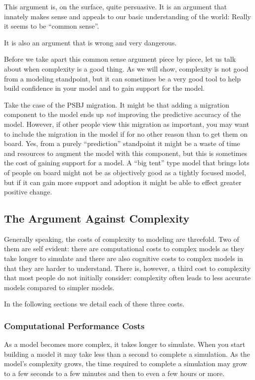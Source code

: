\documentclass[]{memoir}
\begin{document}
This argument is, on the surface, quite persuasive. It is an argument
that innately makes sense and appeals to our basic understanding of the
world: Really it seems to be ``common sense''.

It is also an argument that is wrong and very dangerous.

Before we take apart this common sense argument piece by piece, let us
talk about when complexity is a good thing. As we will show, complexity
is not good from a modeling standpoint, but it can sometimes be a very
good tool to help build confidence in your model and to gain support for
the model.

Take the case of the PSBJ migration. It might be that adding a migration
component to the model ends up \emph{not} improving the predictive
accuracy of the model. However, if other people view this migration as
important, you may want to include the migration in the model if for no
other reason than to get them on board. Yes, from a purely
``prediction'' standpoint it might be a waste of time and resources to
augment the model with this component, but this is sometimes the cost of
gaining support for a model. A ``big tent'' type model that brings lots
of people on board might not be as objectively good as a tightly focused
model, but if it can gain more support and adoption it might be able to
effect greater positive change.

\subsection{The Argument Against Complexity}

Generally speaking, the costs of complexity to modeling are threefold.
Two of them are self evident: there are computational costs to complex
models as they take longer to simulate and there are also cognitive
costs to complex models in that they are harder to understand. There is,
however, a third cost to complexity that most people do not initially
consider: complexity often leads to less accurate models compared to
simpler models.

In the following sections we detail each of these three costs.

\subsubsection{Computational Performance Costs}

As a model becomes more complex, it takes longer to simulate. When you
start building a model it may take less than a second to complete a
simulation. As the model's complexity grows, the time required to
complete a simulation may grow to a few seconds to a few minutes and
then to even a few hours or more.
\end{document}
